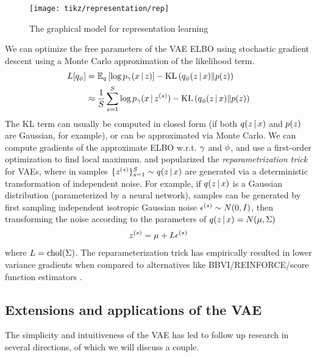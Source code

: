 \begin{figure}[htp!]
    \centering
    \texttt{[image: tikz/representation/rep]}
    \caption{The graphical model for representation learning}
    \label{fig:graphical-model-rep}
\end{figure}

We can optimize the free parameters of the VAE ELBO
using stochastic gradient descent
using a Monte Carlo approximation of the likelihood term.
\begin{align*}
L[q_\phi] &= \mathbb{E}_q \left[ \log p_\gamma(x \,|\, z)\right] - \mathrm{KL}\left(q_\phi(z \,|\, x)\|p(z)\right) \\
                 &\approx \frac{1}{S}\sum_{s = 1}^S \log p_\gamma(x \,|\, z^{(s)}) - \mathrm{KL}\left(q_\phi(z \,|\, x)\|p(z)\right)
\end{align*}
The KL term can usually be computed in closed form (if both $q(z \,|\, x)$ and $p(z)$ are Gaussian, for example), or can be approximated
via Monte Carlo. We can compute gradients of the approximate
ELBO w.r.t. $\gamma$ and $\phi$, and use a
first-order optimization to find local maximum. \citet{Kingma2014} and \citet{Rezende2014}
popularized the \emph{reparametrization trick} for VAEs,
where in samples $\{z^{(s)}\}_{s = 1}^S \sim q(z \,|\, x)$ are generated
via a deterministic transformation of independent noise.
For example, if $q(z \,|\, x)$ is a Gaussian distribution (parameterized
by a neural network), samples can be generated
by first sampling independent isotropic Gaussian noise $\epsilon^{(s)} \sim N(0, I)$, then transforming the noise according to the parameters
of $q(z \,|\, x) = N(\mu, \Sigma)$
\begin{align*}
    z^{(s)} = \mu + L\epsilon^{(s)}
\end{align*}
where $L = \mathrm{chol}(\Sigma)$. The reparameterization trick
has empirically resulted in lower variance gradients
when compared to alternatives
like BBVI/REINFORCE/score function estimators \citep{Ranganath2014, Williams1992}.

\subsection{Extensions and applications of the VAE}
The simplicity and intuitiveness of the
VAE has led to follow up research
in several directions, of which we
will discuss a couple.

